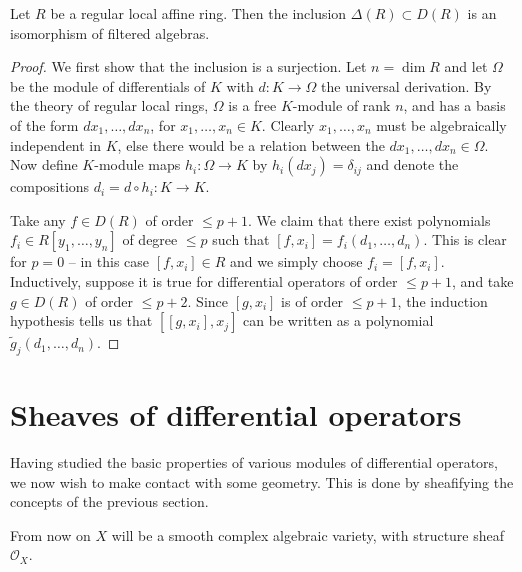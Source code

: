 \begin{theorem}
    Let $R$ be a regular local affine ring. Then the inclusion $\Delta(R)\subset D(R)$
    is an isomorphism of filtered algebras.
    \label{thm:localcase}
\end{theorem}
\begin{proof}
    We first show that the inclusion is a surjection.
    Let $n=\dim R$ and let $\Omega$ be the module of differentials of $K$ with $d:K\to\Omega$
    the universal derivation. By the theory of regular local rings, $\Omega$ is a free $K$-module
    of rank $n$, and has a basis of the form $dx_1,\ldots, dx_n$, for $x_1,\ldots,x_n\in K$.
    Clearly $x_1,\ldots,x_n$ must be algebraically independent in $K$, else there would be
    a relation between the $dx_1,\ldots,dx_n\in\Omega$. Now define $K$-module maps $h_i:\Omega\to K$
    by $h_i(dx_j)=\delta_{ij}$ and denote the compositions $d_i = d\circ h_i:K\to K.$

    Take any $f\in D(R)$ of order $\leqslant p+1$. We claim that there exist polynomials
    $f_i\in R[y_1,\ldots,y_n]$ of degree $\leqslant p$ such that $[f,x_i]=f_i(d_1,\ldots,d_n)$.
    This is clear for $p=0$ --
    in this case $[f,x_i]\in R$ and we simply choose $f_i=[f,x_i]$. Inductively, suppose
    it is true for differential operators of order $\leqslant p+1$, and take $g\in D(R)$
    of order $\leqslant p+2$. Since $[g,x_i]$ is of order $\leqslant p+1$, the induction
    hypothesis tells us that $[[g,x_i],x_j]$ can be written as a polynomial
    $\tilde g_j(d_1,\ldots,d_n)$.
\end{proof}


\section{Sheaves of differential operators}

Having studied the basic properties of various modules of differential operators,
we now wish to make contact with some geometry. This is done by sheafifying the concepts
of the previous section.

From now on $X$ will be a smooth complex algebraic variety, with structure sheaf $\mathcal{O}_X$.

